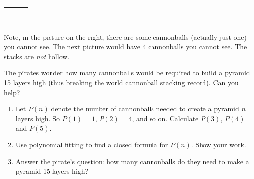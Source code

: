 \documentclass[12pt,]{book}
\theoremstyle{plain}
\theoremstyle{definition}
\theoremstyle{definition}
\theoremstyle{definition}
\numberwithin{equation}{chapter}
\newlength{\panelmax}
\begin{document}
\begin{exerciselist}
{\begin{lrbox}{\panelboxCimage}
{{}
}\end{lrbox}
\ifdefined\phCimage\else\newlength{\phCimage}\fi%
\setlength{\phCimage}{\ht\panelboxCimage+\dp\panelboxCimage}
\settototalheight{\phCimage}{\usebox{\panelboxCimage}}
\setlength{\panelmax}{\maxof{\panelmax}{\phCimage}}
\leavevmode%
\setlength{\tabcolsep}{0.08\linewidth}
\par\medskip\noindent
\hspace*{0.08\linewidth}%
\begin{tabular}{@{}*{3}{c}@{}}
\begin{minipage}[c][\panelmax][b]{0.08\linewidth}\usebox{\panelboxAimage}\end{minipage}&
\begin{minipage}[c][\panelmax][b]{0.18\linewidth}\usebox{\panelboxBimage}\end{minipage}&
\begin{minipage}[c][\panelmax][b]{0.26\linewidth}\usebox{\panelboxCimage}\end{minipage}\end{tabular}\\
}%
\par
\hypertarget{p-266}{}%
Note, in the picture on the right, there are some cannonballs (actually just one) you cannot see. The next picture would have 4 cannonballs you cannot see. The stacks are \emph{not} hollow.%
\par
\hypertarget{p-267}{}%
The pirates wonder how many cannonballs would be required to build a pyramid 15 layers high (thus breaking the world cannonball stacking record). Can you help?%
\par
\hypertarget{p-268}{}%
\leavevmode%
\begin{enumerate}[label=(\alph*)]
\item\hypertarget{li-170}{}\hypertarget{p-269}{}%
Let \(P(n)\) denote the number of cannonballs needed to create a pyramid \(n\) layers high. So \(P(1) = 1\), \(P(2) = 4\), and so on. Calculate \(P(3)\), \(P(4)\) and \(P(5)\). %
\item\hypertarget{li-171}{}\hypertarget{p-270}{}%
Use polynomial fitting to find a closed formula for \(P(n)\). Show your work. %
\item\hypertarget{li-172}{}\hypertarget{p-271}{}%
Answer the pirate's question: how many cannonballs do they need to make a pyramid 15 layers high? %

\end{enumerate}
\end{exerciselist}
\end{document}
